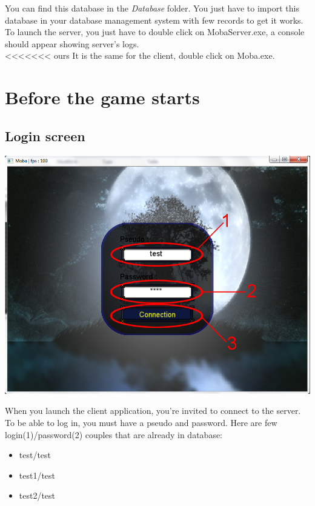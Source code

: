 \documentclass{scrreprt}
\begin{document}
		  You can find this database in the \emph{Database} folder. You just have to import this database in your database management system with few records to get it works.\\

		  To launch the server, you just have to double click on MobaServer.exe, a console should appear showing server's logs.\\
<<<<<<< ours
			  It is the same for the client, double click on Moba.exe.

			  \chapter{Before the game starts}
			  \section{Login screen}
			  \begin{center}
			  \includegraphics[scale=0.4]{connection_screen.png}
			  \end{center}
			  When you launch the client application, you're invited to connect to the server. To be able to log in, you must have a pseudo and password. Here are few login(1)/password(2) couples that are already in database:
			  \begin{itemize}
			  \item{test/test}
			  \item{test1/test}
			  \item{test2/test}
			  \end{itemize}
\end{document}
